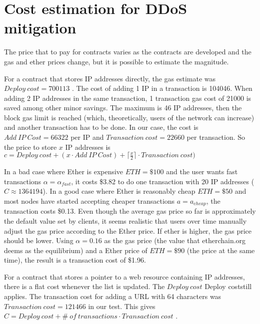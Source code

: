 \section{Cost estimation for DDoS mitigation}

The price that to pay for contracts varies as the contracts are developed and the gas and ether prices change, but it is possible to estimate the magnitude.

For a contract that stores IP addresses directly, the gas estimate was $ Deploy\ cost = 700113$ . The cost of adding 1 IP in a transaction is 104046. When adding 2 IP addresses in the same transaction, 1 transaction gas cost of 21000 is saved among other minor savings.  The maximum is 46 IP addresses, then the block gas limit is reached (which, theoretically, users of the network can increase) and another transaction has to be done. In our case, the cost is $ Add \ IP\ Cost = 66322 $ per IP and $ Transaction\ cost = 22660 $ per transaction. So the price to store $ x $ IP addresses is $ c = Deploy\ cost + (x \cdot Add\ IP\ Cost) + \lceil\frac{x}{2}\rceil \cdot Transaction\ cost) $

In a bad case where Ether is expensive $ ETH = \$100 $ and the user wants fast transactions $ \alpha = \alpha_{fast} $, it costs \$3.82 to do one transaction with 20 IP addresses ($ C \approx 1364194 $). In a good case where Ether is reasonably cheap $ ETH = \$50 $ and most nodes have started accepting cheaper transactions $ a = a_{cheap} $, the transaction costs \$0.13. Even though the average gas price so far is approximately the default value set by clients, it seems realistic that users over time manually adjust the gas price according to the Ether price. If ether is higher, the gas price should be lower. Using $ \alpha = 0.16 $ as the gas price (the value that etherchain.org deems as the equilibrium) and a Ether price of $ ETH = \$90 $ (the price at the same time), the result is a transaction cost of \$1.96.

For a contract that stores a pointer to a web resource containing IP addresses, there is a flat cost whenever the list is updated. The $Deploy\ cost$ Deploy coststill applies. The transaction cost for adding a URL with 64 characters was $ Transaction\ cost = 121466 $ in our test. This gives $ C = Deploy\ cost + \#\ of\ transactions \cdot Transaction\ cost$ .
